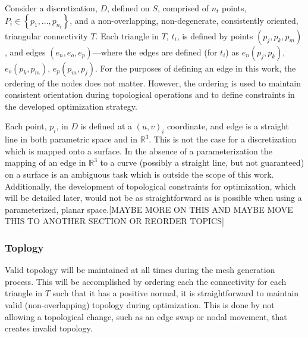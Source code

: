 Consider a discretization, $D$, defined on $S$, comprised of $n_t$
points, $P_i \in \left\{p_1,...,p_{n_t} \right\}$, and a
non-overlapping, non-degenerate, consistently oriented, triangular
connectivity $T$. Each triangle in $T$, $t_i$, is defined by points
$\left(p_j, p_k, p_m\right)$, and edges $\left(e_n, e_o,
e_p\right)$---where the edges are defined (for $t_i$) as $e_n
\left(p_j, p_k\right)$, $e_o \left(p_k, p_m\right)$, $e_p \left(p_m,
p_j\right)$. For the purposes of defining an edge in this work, the
ordering of the nodes does not matter. However, the ordering is used to
maintain consistent orientation during topological operations and to
define constraints in the developed optimization strategy.

Each point, $p_i$, in $D$ is defined at a $\left(u,v\right)_i$
coordinate, and edge is a straight line in both parametric space and in
${\mathbb R}^3$. This is not the case for a discretization which is
mapped onto a surface. In the absence of a parameterization the mapping
of an edge in ${\mathbb R}^3$ to a curve (possibly a straight line, but
not guaranteed) on a surface is an ambiguous task which is outside
the scope of this work. Additionally, the development of topological
constraints for optimization, which will be detailed later, would not be
as straightforward as is possible when using a parameterized, planar
space.[MAYBE MORE ON THIS AND MAYBE MOVE THIS TO ANOTHER SECTION OR
REORDER TOPICS]

\subsubsection{Toplogy}
Valid topology will be maintained at all times during the mesh
generation process. This will be accomplished by ordering each the
connectivity for each triangle in $T$ such that it has a positive
normal, it is straightforward to maintain valid (non-overlapping)
topology during optimization. This is done by not allowing a
topological change, such as an edge swap or nodal movement, that
creates invalid topology.

